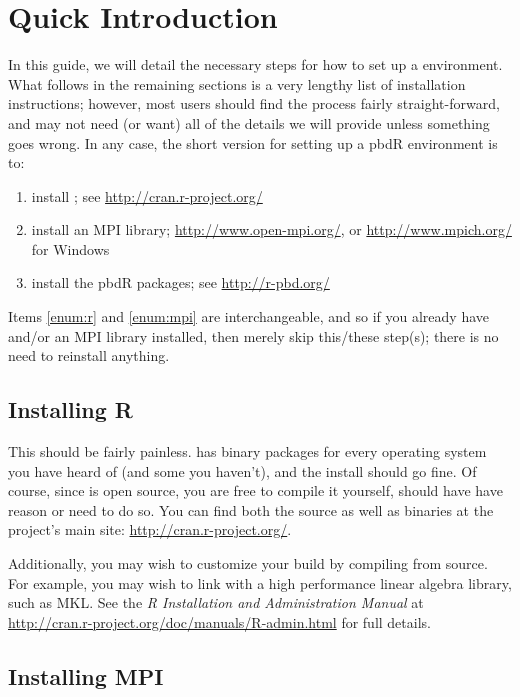 \section{Quick Introduction}

In this guide, we will detail the necessary steps for how to set up a  environment.  What follows in the remaining sections is a very lengthy list of installation instructions; however, most users should find the process fairly straight-forward, and may not need (or want) all of the details we will provide unless something goes wrong.  In any case, the short version for setting up a pbdR environment is to:
\begin{enumerate}
  \item install  \label{enum:r}; see \url{http://cran.r-project.org/}
  \item install an MPI library\label{enum:mpi}; \url{http://www.open-mpi.org/}, or \url{http://www.mpich.org/} for Windows
  \item install the pbdR packages; see \url{http://r-pbd.org/}
\end{enumerate}

Items \ref{enum:r} and \ref{enum:mpi} are interchangeable, and so if you already have   and/or an MPI library installed, then merely skip this/these step(s); there is no need to reinstall anything.

\subsection{Installing R}
This should be fairly painless.   has binary packages for every operating system you have heard of (and some you haven't), and the install should go fine.  Of course, since  is open source, you are free to compile it yourself, should have have reason or need to do so.  You can find both the source as well as binaries at the  project's main site: \url{http://cran.r-project.org/}.  

Additionally, you may wish to customize your  build by compiling from source.  For example, you may wish to link  with a high performance linear algebra library, such as MKL.  See the \emph{R Installation and Administration Manual} at \url{http://cran.r-project.org/doc/manuals/R-admin.html} for full details.  


\subsection{Installing MPI}
   


